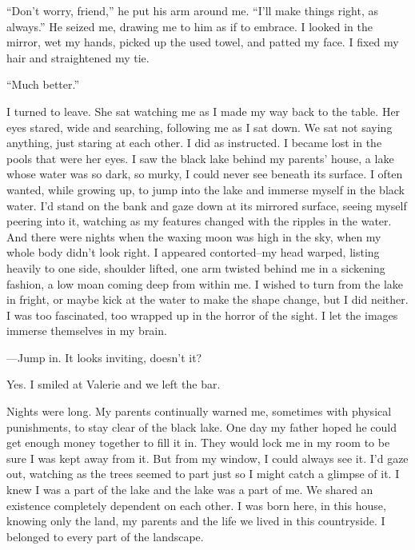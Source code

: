 \documentclass[
]{article}
\begin{document}
``Don't worry, friend,'' he put his arm around me. ``I'll make things
right, as always.'' He seized me, drawing me to him as if to embrace. I
looked in the mirror, wet my hands, picked up the used towel, and patted
my face. I fixed my hair and straightened my tie.

``Much better.''

I turned to leave. She sat watching me as I made my way back to the
table. Her eyes stared, wide and searching, following me as I sat down.
We sat not saying anything, just staring at each other. I did as
instructed. I became lost in the pools that were her eyes. I saw the
black lake behind my parents' house, a lake whose water was so dark, so
murky, I could never see beneath its surface. I often wanted, while
growing up, to jump into the lake and immerse myself in the black water.
I'd stand on the bank and gaze down at its mirrored surface, seeing
myself peering into it, watching as my features changed with the ripples
in the water. And there were nights when the waxing moon was high in the
sky, when my whole body didn't look right. I appeared contorted--my head
warped, listing heavily to one side, shoulder lifted, one arm twisted
behind me in a sickening fashion, a low moan coming deep from within me.
I wished to turn from the lake in fright, or maybe kick at the water to
make the shape change, but I did neither. I was too fascinated, too
wrapped up in the horror of the sight. I let the images immerse
themselves in my brain.

---Jump in. It looks inviting, doesn't it?

Yes. I smiled at Valerie and we left the bar.

Nights were long. My parents continually warned me, sometimes with
physical punishments, to stay clear of the black lake. One day my father
hoped he could get enough money together to fill it in. They would lock
me in my room to be sure I was kept away from it. But from my window, I
could always see it. I'd gaze out, watching as the trees seemed to part
just so I might catch a glimpse of it. I knew I was a part of the lake
and the lake was a part of me. We shared an existence completely
dependent on each other. I was born here, in this house, knowing only
the land, my parents and the life we lived in this countryside. I
belonged to every part of the landscape.
\end{document}
